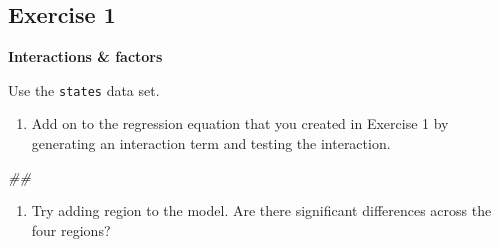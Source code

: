 \documentclass[
]{book}
\newenvironment{Shaded}{\begin{snugshade}}{\end{snugshade}}
\newcommand{\CommentTok}[1]{\textcolor[rgb]{0.56,0.35,0.01}{\textit{#1}}}
\newcommand{\DataTypeTok}[1]{\textcolor[rgb]{0.13,0.29,0.53}{#1}}
\newcommand{\DecValTok}[1]{\textcolor[rgb]{0.00,0.00,0.81}{#1}}
\newcommand{\KeywordTok}[1]{\textcolor[rgb]{0.13,0.29,0.53}{\textbf{#1}}}
\newcommand{\NormalTok}[1]{#1}
\newcommand{\OperatorTok}[1]{\textcolor[rgb]{0.81,0.36,0.00}{\textbf{#1}}}
\newcommand{\StringTok}[1]{\textcolor[rgb]{0.31,0.60,0.02}{#1}}
\providecommand{\tightlist}{%
  \setlength{\itemsep}{0pt}\setlength{\parskip}{0pt}}
\begin{document}
\begin{Shaded}
\end{Shaded}

\hypertarget{exercise-1-1}{%
\subsection{Exercise 1}\label{exercise-1-1}}

\textbf{Interactions \& factors}

Use the \texttt{states} data set.

\begin{enumerate}
\def\labelenumi{\arabic{enumi}.}
\tightlist
\item
  Add on to the regression equation that you created in Exercise 1 by generating an interaction term and testing the interaction.
\end{enumerate}

\begin{Shaded}
\begin{Highlighting}[]
\CommentTok{## }
\end{Highlighting}
\end{Shaded}

\begin{enumerate}
\def\labelenumi{\arabic{enumi}.}
\setcounter{enumi}{1}
\tightlist
\item
  Try adding region to the model. Are there significant differences across the four regions?
\end{enumerate}
\end{document}
